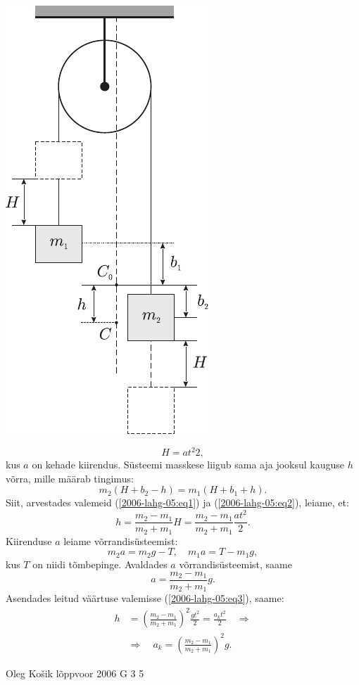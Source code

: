 \documentclass[11pt]{article}
\begin{document}
{{\begin{center}
	\includegraphics[width=0.4\linewidth]{2006-lahg-05-lah}
\end{center}

\begin{equation} \label{2006-lahg-05:eq2}
H = at^2 2,
\end{equation}
kus $a$ on kehade kiirendus. Süsteemi masskese liigub sama aja jooksul kauguse $h$ võrra, mille määrab tingimus:
\[
m_2 (H + b_2 - h) = m_1 (H + b_1 + h).
\]
Siit, arvestades valemeid (\ref{2006-lahg-05:eq1}) ja (\ref{2006-lahg-05:eq2}), leiame, et:
\begin{equation} \label{2006-lahg-05:eq3}
h=\frac{m_{2}-m_{1}}{m_{2}+m_{1}} H=\frac{m_{2}-m_{1}}{m_{2}+m_{1}} \frac{a t^{2}}{2}.
\end{equation}
Kiirenduse $a$ leiame võrrandisüsteemist: 
\[
m_2a = m_2g - T,\quad m_1a = T - m_1g,
\]
kus $T$ on niidi tõmbepinge. Avaldades $a$ võrrandisüsteemist, saame
\[
a=\frac{m_{2}-m_{1}}{m_{2}+m_{1}} g.
\]
Asendades leitud väärtuse valemisse (\ref{2006-lahg-05:eq3}), saame:
\[
\begin{aligned}
h&=\left(\frac{m_{2}-m_{1}}{m_{2}+m_{1}}\right)^{2} \frac{g t^{2}}{2}=\frac{a_{k} t^{2}}{2} \quad \Rightarrow \\ 
&\Rightarrow \quad a_{k}=\left(\frac{m_{2}-m_{1}}{m_{2}+m_{1}}\right)^{2} g.
\end{aligned}
\]
\fi
}

{Oleg Košik} %
{lõppvoor} %
{2006} %
{G 3} %
{5} %
{

}}
\end{document}
